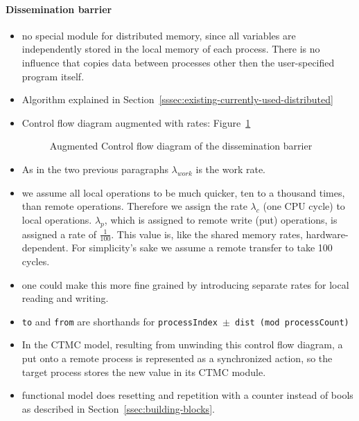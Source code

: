 \documentclass[a4paper, 10pt]{article}
\begin{document}
\begin{enumerate}
\paragraph{Dissemination barrier}
\label{ssssec:analysis-modelchecking-modelling-dissemination}
\begin{itemize}
	\item no special module for distributed memory, since all variables are independently stored in the local memory of each process. There is no influence that copies data between processes other then the user-specified program itself.
	\item Algorithm explained in Section~\ref{sssec:existing-currently-used-distributed}
	\item Control flow diagram augmented with rates: Figure~\ref{fig:dissemination-control-flow}
		\begin{figure}[htbp]
			\centering
			
			\caption{Augmented Control flow diagram of the dissemination barrier}
			\label{fig:dissemination-control-flow}
		\end{figure}
	\item As in the two previous paragraphs $\lambda_{work}$ is the work rate.
	\item we assume all local operations to be much quicker, ten to a thousand times, than remote operations. Therefore we assign the rate $\lambda_c$ (one CPU cycle) to local operations. $\lambda_p$, which is assigned to remote write (put) operations, is assigned a rate of $\frac{1}{100}$. This value is, like the shared memory rates, hardware-dependent. For simplicity's sake we assume a remote transfer to take 100 cycles.
	\item one could make this more fine grained by introducing separate rates for local reading and writing.
	\item \texttt{to} and \texttt{from} are shorthands for \texttt{processIndex $\pm$ dist (mod processCount)}
	\item In the CTMC model, resulting from unwinding this control flow diagram, a put onto a remote process is represented as a synchronized action, so the target process stores the new value in its CTMC module.
	\item functional model does resetting and repetition with a counter instead of bools as described in Section~\ref{ssec:building-blocks}.
\end{itemize}


\end{enumerate}
\end{document}
